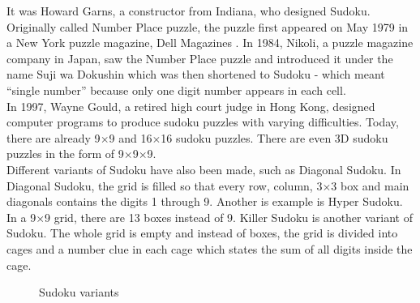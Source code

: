 \documentclass[a4paper,oneside,11pt]{report}
\newcounter{row}
\newcounter{col}
\begin{document}
It was Howard Garns, a constructor from Indiana, who designed Sudoku. Originally called Number Place puzzle, the puzzle first appeared on May 1979 in a New York puzzle magazine, Dell Magazines \cite{Wilson}. In 1984, Nikoli, a puzzle magazine company in Japan, saw the Number Place puzzle and introduced it under the name Suji wa Dokushin which was then shortened to Sudoku - which meant “single number” because only one digit number appears in each cell.\\

In 1997, Wayne Gould, a retired high court judge in Hong Kong, designed computer programs to produce sudoku puzzles with varying difficulties. Today, there are already 9$\times$9 and 16$\times$16 sudoku puzzles. There are even 3D sudoku puzzles in the form of 9$\times$9$\times$9.\\

Different variants of Sudoku have also been made, such as Diagonal Sudoku. In Diagonal Sudoku, the grid is filled so that every row, column, 3$\times$3 box and main diagonals contains the digits 1 through 9. Another is example is Hyper Sudoku. In a 9$\times$9 grid, there are 13 boxes instead of 9. Killer Sudoku is another variant of Sudoku. The whole grid is empty and instead of boxes, the grid is divided into cages and a number clue in each cage which states the sum of all digits inside the cage.\\

\begin{figure}[h]
  \centering
  \hspace{0.5cm}
  \hspace{0.5cm}
  \caption{Sudoku variants}
\end{figure}
\end{document}
